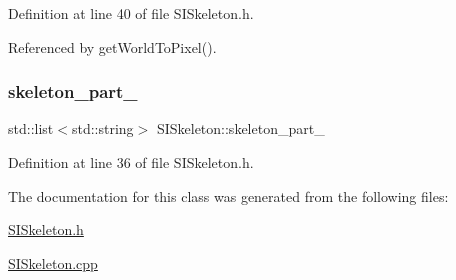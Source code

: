 Definition at line 40 of file S\+I\+Skeleton.\+h.



Referenced by get\+World\+To\+Pixel().

\mbox{\label{classSISkeleton_a9407c2f3b0889c2eda6f24120ea47559}} 
\subsubsection{\texorpdfstring{skeleton\+\_\+part\+\_\+}{skeleton\_part\_}}
{\footnotesize\ttfamily std\+::list$<$std\+::string$>$ S\+I\+Skeleton\+::skeleton\+\_\+part\+\_\+\hspace{0.3cm}{\ttfamily [private]}}



Definition at line 36 of file S\+I\+Skeleton.\+h.



The documentation for this class was generated from the following files\+:\begin{DoxyCompactItemize}
\item 
\mbox{\hyperlink{SISkeleton_8h}{S\+I\+Skeleton.\+h}}\item 
\mbox{\hyperlink{SISkeleton_8cpp}{S\+I\+Skeleton.\+cpp}}\end{DoxyCompactItemize}
